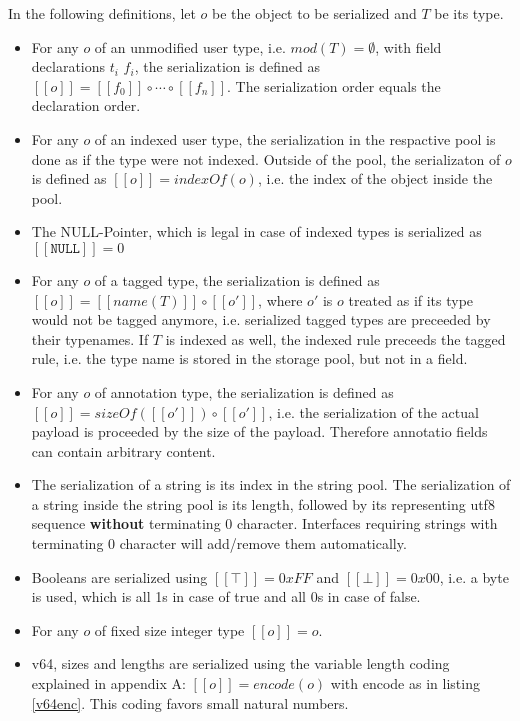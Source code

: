 \documentclass[a4paper,10pt]{article}
\newcommand{\den}[1]{[\![#1]\!]}
\begin{document}
In the following definitions, let $o$ be the object to be serialized and $T$ be its type.
\begin{itemize}
 \item For any $o$ of an unmodified user type, i.e. $mod(T)=\emptyset$, with field declarations $t_i$ $f_i$, the serialization is defined as $\den{o} = \den{f_0} \circ \cdots \circ \den{f_n}$. The serialization order equals the declaration order.
 \item For any $o$ of an indexed user type, the serialization in the respactive pool is done as if the type were not indexed. Outside of the pool, the serializaton of $o$ is defined as $\den{o} = indexOf(o)$, i.e. the index of the object inside the pool.
 \item The NULL-Pointer, which is legal in case of indexed types is serialized as $\den{\texttt{NULL}} = 0$
 \item For any $o$ of a tagged type, the serialization is defined as $\den{o} = \den{name(T)} \circ \den{o'}$, where $o'$ is $o$ treated as if its type would not be tagged anymore, i.e. serialized tagged types are preceeded by their typenames. If $T$ is indexed as well, the indexed rule preceeds the tagged rule, i.e. the type name is stored in the storage pool, but not in a field.
 \item For any $o$ of annotation type, the serialization is defined as $\den{o} = sizeOf(\den{o'}) \circ \den{o'}$, i.e. the serialization of the actual payload is proceeded by the size of the payload. Therefore annotatio fields can contain arbitrary content.
 
 \item The serialization of a string is its index in the string pool. The serialization of a string inside the string pool is its length, followed by its representing utf8 sequence \textbf{without} terminating 0 character. Interfaces requiring strings with terminating 0 character will add/remove them automatically.
 \item Booleans are serialized using $\den{\top} = 0xFF$ and $\den{\bot} = 0x00$, i.e. a byte is used, which is all 1s in case of true and all 0s in case of false.
 
 \item For any $o$ of fixed size integer type $\den{o} = o$.
 \item v64, sizes and lengths are serialized using the variable length coding explained in appendix A: $\den{o} = encode(o)$ with encode as in listing \ref{v64enc}. This coding favors small natural numbers.
 

\end{itemize}
\end{document}

